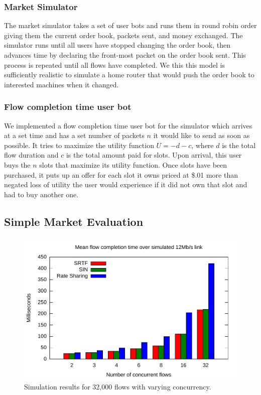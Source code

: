 \subsubsection{Market Simulator}
The market simulator takes a set of user bots and runs them in round robin order giving them the current order book, packets sent, and money exchanged. The simulator runs until all users have stopped changing the order book, then advances time by declaring the front-most packet on the order book sent. This process is repeated until all flows have completed. We this this model is sufficiently realistic to simulate a home router that would push the order book to interested machines when it changed.

\subsubsection{Flow completion time user bot}
We implemented a flow completion time user bot for the simulator which arrives at a set time and has a set number of packets $n$ it would like to send as soon as possible. It tries to maximize the utility function $U= -d - c$, where $d$ is the total flow duration and $c$ is the total amount paid for slots.
Upon arrival, this user buys the $n$ slots that maximize its utility function. Once slots have been purchased, it puts up an offer for each slot it owns priced at \$.01 more than negated loss of utility the user would experience if it did not own that slot and had to buy another one.

\subsection{Simple Market Evaluation}
\begin{figure}
\includegraphics[width=\columnwidth]{plots/delay_over_srtf.pdf}
\caption{Simulation results for 32,000 flows with varying concurrency.}
\label{f:delay_over_srtf}
\end{figure}

